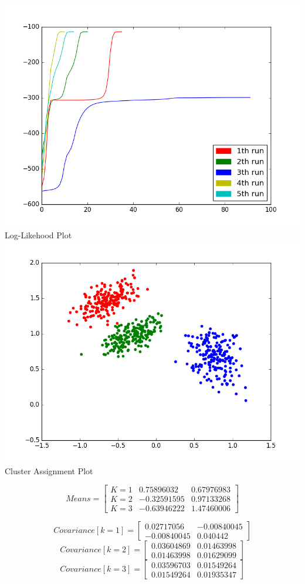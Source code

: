 \documentclass[]{report}
\begin{document}
	\begin{center}
		\includegraphics[width=\textwidth]{LogLikelihood}
		Log-Likehood Plot
		\includegraphics[width=\textwidth]{EM-Scatterplot}
		Cluster Assignment Plot
	\end{center}
\[ 
	Means = \begin{bmatrix}
		K=1 &   0.75896032 & 0.67976983 \\
		K=2 &  -0.32591595 & 0.97133268 \\
		K=3 &  -0.63946222 & 1.47460006 
	\end{bmatrix} 
\]

\[
	Covariance[k = 1] = \begin{bmatrix}
		0.02717056  & -0.00840045 \\
	 	-0.00840045 &  0.040442 
	\end{bmatrix}
\]
\[	
	Covariance[k = 2] = \begin{bmatrix}
		0.03604869 & 0.01463998 \\
 		0.01463998 & 0.01629099 
	\end{bmatrix}
\]
\[	
	Covariance[k = 3] = \begin{bmatrix}
		0.03596703 & 0.01549264  \\
 		0.01549264 & 0.01935347 
	\end{bmatrix}
\]
\end{document}
